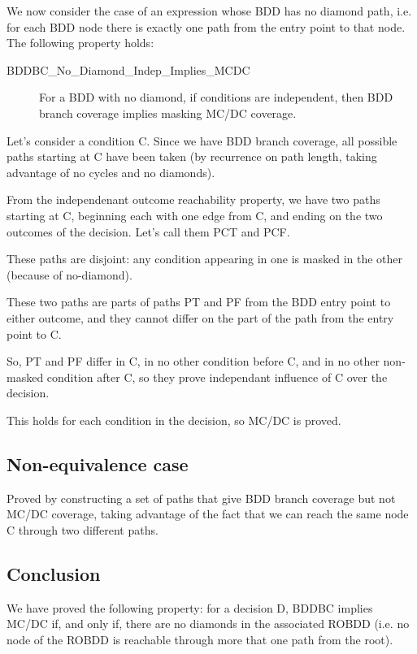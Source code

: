 \documentclass[a4paper,12pt,twoside]{article}
\begin{document}
We now consider the case of an expression whose BDD has no diamond path,
i.e. for each BDD node there is exactly one path from the entry point to
that node. The following property holds:

\begin{description}
\item[BDDBC\_No\_Diamond\_Indep\_Implies\_MCDC]
  For a BDD with no diamond, if conditions are independent, then
  BDD branch coverage implies masking MC/DC coverage.
\end{description}

Let's consider a condition C. Since we have BDD branch coverage,
all possible paths starting at C have been taken (by recurrence on path
length, taking advantage of no cycles and no diamonds).

From the independenant outcome reachability property, we have two paths
starting at C, beginning each with one edge from C, and ending on the
two outcomes of the decision. Let's call them PCT and PCF.

These paths are disjoint: any condition appearing in one is masked
in the other (because of no-diamond).

These two paths are parts of paths PT and PF from the BDD entry point to
either outcome, and they cannot differ on the part of the path from the
entry point to C.

So, PT and PF differ in C, in no other condition before C, and in no
other non-masked condition after C, so they prove independant influence
of C over the decision.

This holds for each condition in the decision, so MC/DC is proved.

\subsection{Non-equivalence case}

Proved by constructing a set of paths that give BDD branch coverage but
not MC/DC coverage, taking advantage of the fact that we can reach the
same node C through two different paths.

\subsection{Conclusion}

We have proved the following property: for a decision D, BDDBC implies
MC/DC if, and only if, there are no diamonds in the associated ROBDD (i.e.
no node of the ROBDD is reachable through more that one path from the root).
\end{document}

